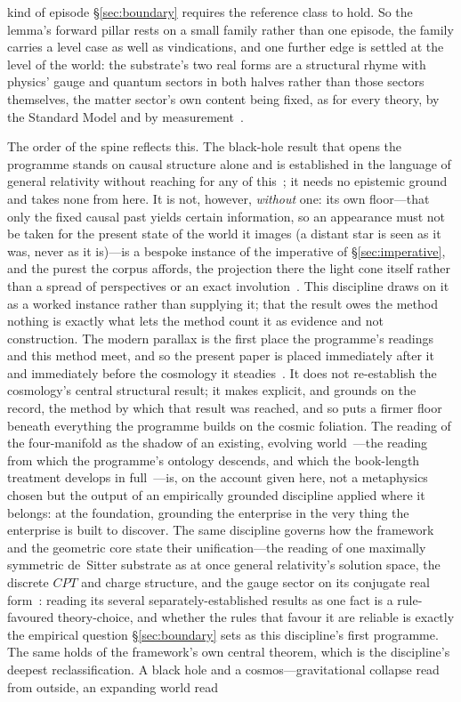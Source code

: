 \documentclass[11pt,a4paper]{article}
\begin{document}
kind of episode \S\ref{sec:boundary} requires the reference class to hold. So the lemma's forward pillar rests on a small family rather than one episode, the family carries a level case as well as vindications, and one further edge is settled at the level of the world: the substrate's two real forms are a structural rhyme with physics' gauge and quantum sectors in both halves rather than those sectors themselves, the matter sector's own content being fixed, as for every theory, by the Standard Model and by measurement~\cite{JanzenBoundary,JanzenMatter}.

The order of the spine reflects this. The black-hole result that opens the programme stands on causal structure alone and is established in the language of general relativity without reaching for any of this~\cite{JanzenBHcausality}; it needs no epistemic ground and takes none from here. It is not, however, \emph{without} one: its own floor---that only the fixed causal past yields certain information, so an appearance must not be taken for the present state of the world it images (a distant star is seen as it was, never as it is)---is a bespoke instance of the imperative of \S\ref{sec:imperative}, and the purest the corpus affords, the projection there the light cone itself rather than a spread of perspectives or an exact involution~\cite{JanzenBHcausality}. This discipline draws on it as a worked instance rather than supplying it; that the result owes the method nothing is exactly what lets the method count it as evidence and not construction. The modern parallax is the first place the programme's readings and this method meet, and so the present paper is placed immediately after it and immediately before the cosmology it steadies~\cite{JanzenCRframework}. It does not re-establish the cosmology's central structural result; it makes explicit, and grounds on the record, the method by which that result was reached, and so puts a firmer floor beneath everything the programme builds on the cosmic foliation. The reading of the four-manifold as the shadow of an existing, evolving world~\cite{JanzenTrope, JanzenWildGoose, JanzenMisconstrue}---the reading from which the programme's ontology descends, and which the book-length treatment develops in full~\cite{Janzen2025}---is, on the account given here, not a metaphysics chosen but the output of an empirically grounded discipline applied where it belongs: at the foundation, grounding the enterprise in the very thing the enterprise is built to discover. The same discipline governs how the framework and the geometric core state their unification---the reading of one maximally symmetric de~Sitter substrate as at once general relativity's solution space, the discrete $CPT$ and charge structure, and the gauge sector on its conjugate real form~\cite{JanzenCRframework,JanzenGeometricCore}: reading its several separately-established results as one fact is a rule-favoured theory-choice, and whether the rules that favour it are reliable is exactly the empirical question \S\ref{sec:boundary} sets as this discipline's first programme. The same holds of the framework's own central theorem, which is the discipline's deepest reclassification. A black hole and a cosmos---gravitational collapse read from outside, an expanding world read 
\end{document}
